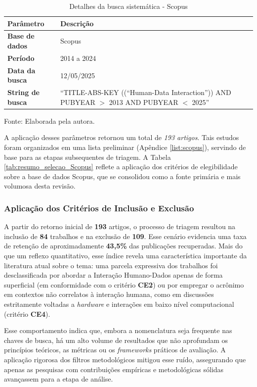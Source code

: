 \documentclass[
	12pt,				%
	oneside,			%
	a4paper,			%
	english,			%
	brazil				%
	]{abntex2ppgsi}
\begin{document}
\begin{table}[htbp]
\centering
\caption{Detalhes da busca sistemática - Scopus}
\label{tab:detalhes_busca}
\renewcommand{\arraystretch}{1.4} 
\begin{tabular}{@{} >{\bfseries}p{3.5cm} p{11cm} @{}}
\toprule
Parâmetro & Descrição \\
\midrule
Base de dados & Scopus \\
Período & 2014 a 2024 \\
Data da busca & 12/05/2025 \\
String de busca & ``TITLE-ABS-KEY ((``Human-Data Interaction'')) AND PUBYEAR $>$ 2013 AND PUBYEAR $<$ 2025'' \\
\bottomrule
\end{tabular}

\vspace{0.2cm} %
{\small Fonte: Elaborada pela autora.}
\end{table}

    A aplicação desses parâmetros retornou um total de \emph{193 artigos}. Tais estudos foram organizados em uma lista preliminar (Apêndice \ref{list:scopus}), servindo de base para as etapas subsequentes de triagem. A Tabela \ref{tab:resumo_selecao_Scopus} reflete a aplicação dos critérios de elegibilidade sobre a base de dados Scopus, que se consolidou como a fonte primária e mais volumosa desta revisão.

\subsubsection{Aplicação dos Critérios de Inclusão e Exclusão}

    A partir do retorno inicial de \textbf{193} artigos, o processo de triagem resultou na inclusão de \textbf{84} trabalhos e na exclusão de \textbf{109}. Esse cenário evidencia uma taxa de retenção de aproximadamente \textbf{43,5\%} das publicações recuperadas. Mais do que um reflexo quantitativo, esse índice revela uma característica importante da literatura atual sobre o tema: uma parcela expressiva dos trabalhos foi desclassificada por abordar a Interação Humano-Dados apenas de forma superficial (em conformidade com o critério \textbf{CE2}) ou por empregar o acrônimo em contextos não correlatos à interação humana, como em discussões estritamente voltadas a \textit{hardware} e interações em baixo nível computacional (critério \textbf{CE4}). 

    Esse comportamento indica que, embora a nomenclatura seja frequente nas chaves de busca, há um alto volume de resultados que não aprofundam os princípios teóricos, as métricas ou os \textit{frameworks} práticos de avaliação. A aplicação rigorosa dos filtros metodológicos mitigou esse ruído, assegurando que apenas as pesquisas com contribuições empíricas e metodológicas sólidas avançassem para a etapa de análise.
    \clearpage
    
\end{document}
